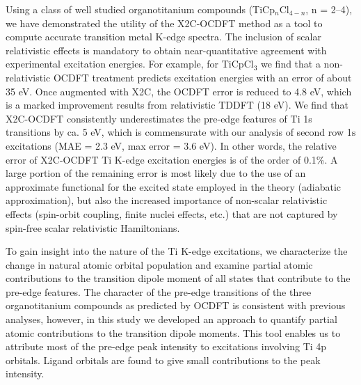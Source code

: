 \documentclass{article}
\begin{document}
Using a class of well studied organotitanium compounds (TiCp$_{n}$Cl$_{4-n}$, n = 2--4), we have demonstrated the utility of the X2C-OCDFT method as a tool to compute accurate transition metal K-edge spectra.
The inclusion of scalar relativistic effects is mandatory to obtain near-quantitative agreement with experimental excitation energies.
For example, for TiCpCl$_3$ we find that a non-relativistic OCDFT treatment predicts excitation energies with an error of about 35 eV.
Once augmented with X2C, the OCDFT error is reduced to 4.8 eV, which is a marked improvement results from relativistic TDDFT (18 eV)\cite{TiCl4-Zeigler}. 
We find that X2C-OCDFT consistently underestimates the pre-edge features of Ti 1s transitions by ca. 5 eV, which is commensurate with our analysis of second row 1$\text{s}$ excitations (MAE = 2.3 eV, max error = 3.6 eV).
In other words, the relative error of X2C-OCDFT Ti K-edge excitation energies is of the order of 0.1\%.
A large portion of the remaining error is most likely due to the use of an approximate functional for the excited state employed in the theory (adiabatic approximation), but also the increased importance of non-scalar relativistic effects (spin-orbit coupling, finite nuclei effects, etc.) that are not captured by spin-free scalar relativistic Hamiltonians.

To gain insight into the nature of the Ti K-edge excitations, we characterize the change in natural atomic orbital population and examine partial atomic contributions to the transition dipole moment of all states that contribute to the pre-edge features.
The character of the pre-edge transitions of the three organotitanium compounds as predicted by OCDFT is consistent with previous analyses,\cite{TiCl4,TiCl4-Zeigler}
however, in this study we developed an approach to quantify partial atomic contributions to the transition dipole moments.
This tool enables us to attribute most of the pre-edge peak intensity to excitations involving Ti 4p orbitals.  Ligand orbitals are found to give small contributions to the peak intensity.
\end{document}
